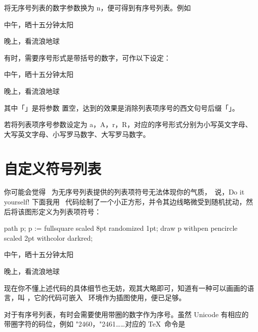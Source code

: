 将无序号列表的数字参数换为 n，便可得到有序号列表。例如

\startsamplecode\startnarrowtyping
\startitemize[n]
\item 中午，晒十五分钟太阳
\item 晚上，看流浪地球 \Romannumerals[2]
\stopitemize
\stopnarrowtyping\stopsamplecode
{}

有时，需要序号形式是带括号的数字，可作以下设定：

\startsamplecode\startnarrowtyping
\startitemize[n][left=(,right=),stopper=]
\item 中午，晒十五分钟太阳
\item 晚上，看流浪地球 \Romannumerals[2]
\stopitemize
\stopnarrowtyping\stopsamplecode
{}

\noindent 其中「」是将参数  置空，达到的效果是消除列表项序号的西文句号后缀「」。

若将列表项序号参数设定为 a，A，r，R，对应的序号形式分别为小写英文字母、大写英文字母、小写罗马数字、大写罗马数字。

\section[item-sym-diy]{自定义符号列表}

你可能会觉得 \ConTeXt\ 为无序号列表提供的列表项符号无法体现你的气质，\ConTeXt\ 说，Do it yourself! 下面我用 \MetaPost\ 代码绘制了一个小正方形，并令其边线略微受到随机扰动，然后将该图形定义为列表项符号：

\startsamplecode\startnarrowtyping
{}
  path p;
  p := fullsquare scaled 8pt randomized 1pt;
  draw p withpen pencircle scaled 2pt
         withcolor darkred;
\stopuseMPgraphic

\startitemize[10]
\item 中午，晒十五分钟太阳
\item 晚上，看流浪地球 
\stopitemize
\stopnarrowtyping\stopsamplecode
{}

\noindent 现在你不懂上述代码的具体细节也无妨，观其大略即可，知道有一种可以画画的语言，叫 \MetaPost，它的代码可嵌入 \ConTeXt\ 环境作为插图使用，便已足够。

对于有序号列表，有时会需要使用带圈的数字作为序号。虽然 Unicode 有相应的带圈字符的码位，例如 \char"2460，\char"2461……对应的 \TeX\ 命令是

